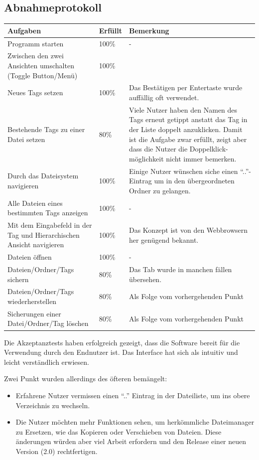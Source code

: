 \documentclass[10pt,paper=a4,final]{scrartcl}
\begin{document}
\subsection{Abnahmeprotokoll}
\begin{tabularx}{\textwidth}{|X|l|X|}
  \hline
  \bf Aufgaben & \bf Erf\"ullt & \bf Bemerkung \\ \hline
  Programm starten & 100\% & - \\ \hline
  Zwischen den zwei Ansichten umschalten (Toggle Button/Menü)& 100\% & \\ \hline
  Neues Tags setzen & 100\% & Das Bestätigen per Entertaste wurde auffällig oft verwendet. \\ \hline
  Bestehende Tags zu einer Datei setzen & 80\% & Viele Nutzer haben den Namen des Tags erneut getippt anstatt das Tag in der Liste doppelt anzuklicken. Damit ist die Aufgabe zwar erf\"ullt, zeigt aber dass die Nutzer die Doppelklick-m\"oglichkeit nicht immer bemerken. \\ \hline
  Durch das Dateisystem navigieren & 100\% & Einige Nutzer wünschen siche einen “..”-Eintrag um in den übergeordneten Ordner zu gelangen. \\ \hline
  Alle Dateien eines bestimmten Tags anzeigen & 100\% & - \\ \hline
  Mit dem Eingabefeld in der Tag und Hierarchischen Ansicht navigieren & 100\% & Das Konzept ist von den Webbrowsern her genügend bekannt. \\ \hline
  Dateien öffnen & 100\% & - \\ \hline
  Dateien/Ordner/Tags sichern & 80\% & Das Tab wurde in manchen f\"allen \"ubersehen. \\ \hline
  Dateien/Ordner/Tags wiederherstellen & 80\% & Als Folge vom vorhergehenden Punkt \\ \hline
  Sicherungen einer Datei/Ordner/Tag löschen & 80\% & Als Folge vom vorhergehenden Punkt \\ \hline
\end{tabularx}
Die Akzeptanztests haben erfolgreich gezeigt, dass die Software bereit für die Verwendung durch den Endnutzer ist.
Das Interface hat sich als intuitiv und leicht verständlich erwiesen.

Zwei Punkt wurden allerdings des öfteren bemängelt:
\begin{itemize}
  \item Erfahrene Nutzer vermissen einen “..” Eintrag in der Dateiliste, um ins obere Verzeichnis zu wechseln.
  \item Die Nutzer möchten mehr Funktionen sehen, um herkömmliche Dateimanager zu Ersetzen, wie das Kopieren oder Verschieben von Dateien. Diese änderungen w\"urden aber viel Arbeit erfordern und den Release einer neuen Version (2.0) rechtfertigen.
\end{itemize}
\end{document}
